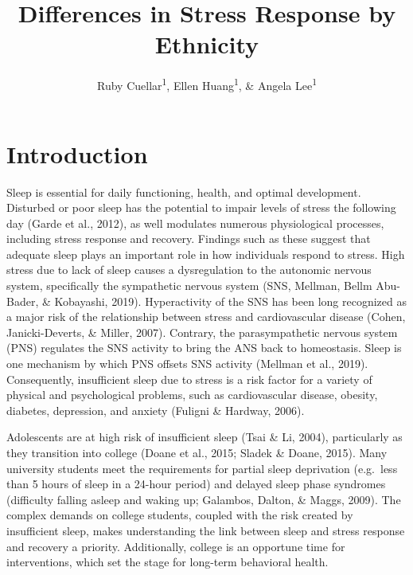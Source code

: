 \documentclass[man, fleqn, noextraspace]{apa6}
\title{Differences in Stress Response by Ethnicity}
\author{Ruby Cuellar\textsuperscript{1}, Ellen Huang\textsuperscript{1}, \& Angela Lee\textsuperscript{1}}
\date{}
\begin{document}
\maketitle

\hypertarget{introduction}{%
\section{Introduction}\label{introduction}}

Sleep is essential for daily functioning, health, and optimal development. Disturbed or poor sleep has the potential to impair levels of stress the following day (Garde et al., 2012), as well modulates numerous physiological processes, including stress response and recovery. Findings such as these suggest that adequate sleep plays an important role in how individuals respond to stress. High stress due to lack of sleep causes a dysregulation to the autonomic nervous system, specifically the sympathetic nervous system (SNS, Mellman, Bellm Abu-Bader, \& Kobayashi, 2019). Hyperactivity of the SNS has been long recognized as a major risk of the relationship between stress and cardiovascular disease (Cohen, Janicki-Deverts, \& Miller, 2007). Contrary, the parasympathetic nervous system (PNS) regulates the SNS activity to bring the ANS back to homeostasis. Sleep is one mechanism by which PNS offsets SNS activity (Mellman et al., 2019). Consequently, insufficient sleep due to stress is a risk factor for a variety of physical and psychological problems, such as cardiovascular disease, obesity, diabetes, depression, and anxiety (Fuligni \& Hardway, 2006).

Adolescents are at high risk of insufficient sleep (Tsai \& Li, 2004), particularly as they transition into college (Doane et al., 2015; Sladek \& Doane, 2015). Many university students meet the requirements for partial sleep deprivation (e.g.~less than 5 hours of sleep in a 24-hour period) and delayed sleep phase syndromes (difficulty falling asleep and waking up; Galambos, Dalton, \& Maggs, 2009). The complex demands on college students, coupled with the risk created by insufficient sleep, makes understanding the link between sleep and stress response and recovery a priority. Additionally, college is an opportune time for interventions, which set the stage for long-term behavioral health.
\end{document}
